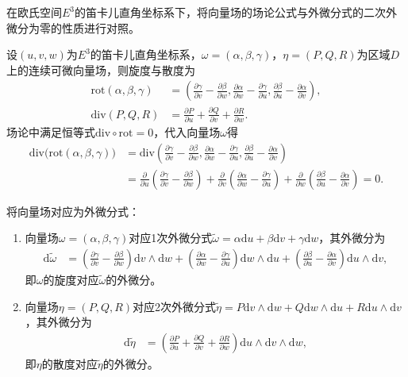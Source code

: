 \documentclass[../../main.tex]{subfiles}%
\begin{document}
\begin{example}
在欧氏空间$E^3$的笛卡儿直角坐标系下，将向量场的场论公式与外微分式的二次外微分为零的性质进行对照。
\end{example}
\begin{solution}
设$(u,v,w)$为$E^3$的笛卡儿直角坐标系，$\omega=(\alpha,\beta,\gamma)$，$\eta=(P,Q,R)$为区域$D$上的连续可微向量场，则旋度与散度为
\begin{align*}
\mathrm{rot}(\alpha,\beta,\gamma) &= \left(\frac{\partial\gamma}{\partial v}-\frac{\partial\beta}{\partial w},\frac{\partial\alpha}{\partial w}-\frac{\partial\gamma}{\partial u},\frac{\partial\beta}{\partial u}-\frac{\partial\alpha}{\partial v}\right), \\
\mathrm{div}(P,Q,R) &= \frac{\partial P}{\partial u}+\frac{\partial Q}{\partial v}+\frac{\partial R}{\partial w}.
\end{align*}
场论中满足恒等式$\mathrm{div}\circ\mathrm{rot}=0$，代入向量场$\omega$得
\begin{align*}
\mathrm{div}\big(\mathrm{rot}(\alpha,\beta,\gamma)\big) &= \mathrm{div}\left(\frac{\partial\gamma}{\partial v}-\frac{\partial\beta}{\partial w},\frac{\partial\alpha}{\partial w}-\frac{\partial\gamma}{\partial u},\frac{\partial\beta}{\partial u}-\frac{\partial\alpha}{\partial v}\right) \\
&= \frac{\partial}{\partial u}\left(\frac{\partial\gamma}{\partial v}-\frac{\partial\beta}{\partial w}\right)+\frac{\partial}{\partial v}\left(\frac{\partial\alpha}{\partial w}-\frac{\partial\gamma}{\partial u}\right)+\frac{\partial}{\partial w}\left(\frac{\partial\beta}{\partial u}-\frac{\partial\alpha}{\partial v}\right)=0.
\end{align*}

将向量场对应为外微分式：
\begin{enumerate}[(1)]
\item 向量场$\omega=(\alpha,\beta,\gamma)$对应1次外微分式$\tilde{\omega}=\alpha\mathrm{d}u+\beta\mathrm{d}v+\gamma\mathrm{d}w$，其外微分为
\begin{align*}
\mathrm{d}\tilde{\omega} &= \left(\frac{\partial\gamma}{\partial v}-\frac{\partial\beta}{\partial w}\right)\mathrm{d}v\land\mathrm{d}w+\left(\frac{\partial\alpha}{\partial w}-\frac{\partial\gamma}{\partial u}\right)\mathrm{d}w\land\mathrm{d}u+\left(\frac{\partial\beta}{\partial u}-\frac{\partial\alpha}{\partial v}\right)\mathrm{d}u\land\mathrm{d}v,
\end{align*}
即$\omega$的旋度对应$\tilde{\omega}$的外微分。
\item 向量场$\eta=(P,Q,R)$对应2次外微分式$\tilde{\eta}=P\mathrm{d}v\land\mathrm{d}w+Q\mathrm{d}w\land\mathrm{d}u+R\mathrm{d}u\land\mathrm{d}v$，其外微分为
\begin{align*}
\mathrm{d}\tilde{\eta} &= \left(\frac{\partial P}{\partial u}+\frac{\partial Q}{\partial v}+\frac{\partial R}{\partial w}\right)\mathrm{d}u\land\mathrm{d}v\land\mathrm{d}w,
\end{align*}
即$\eta$的散度对应$\tilde{\eta}$的外微分。
\end{enumerate}


\end{solution}
\end{document}
